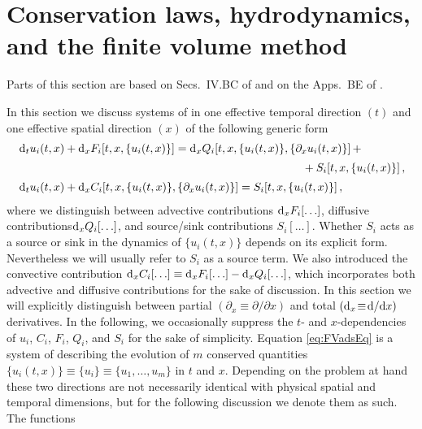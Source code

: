 \section{Conservation laws, hydrodynamics, and the finite volume method}\label{sec:conservationLaws}
\begin{disclaimer}
	Parts of this section are based on Secs.~IV.B\dash{}C of  and on the Apps.~B\dash{}E of . 
\end{disclaimer}
In this section we discuss systems of \pdes{} in one effective temporal direction $(t)$ and one effective spatial direction $(x)$ of the following generic form
\begin{align}
	&\dift\! u_i ( t, x ) + \difx\!  F_i [ t, x, \{u_i ( t, x )\} ] = \difx\! Q_i [ t, x, \{u_i ( t, x )\}, \{\partial_x u_i ( t, x )\} ]\,+\notag\\*[.2em] %
	&\hphantom{\dift\! u_i ( t, x ) + \difx\!  F_i [ t, x, \{u_i ( t, x )\} ] = \difx\! Q_i [ t, x, \{u_i ( t, x )\}xxx}+S_i [ t, x, \{u_i ( t, x )\} ] \, , \label{eq:FVadsEq}\\[.2em]
	&\dift\! u_i ( t, x ) + \difx\! C_i [ t, x, \{u_i ( t, x )\}, \{\partial_x u_i ( t, x )\} ] = S_i [ t, x, \{u_i ( t, x )\} ] \, , \label{eq:FVcsEq}
\end{align}
where we distinguish between advective contributions $\difx\! F_i[\ldots]$, diffusive contributions$\difx\! Q_i[\ldots]$, and source/sink contributions $S_i [\ldots]$.
Whether $S_i$ acts as a source or sink in the dynamics of $\{u_i(t,x)\}$ depends on its explicit form.
Nevertheless we will usually refer to $S_i$ as a source term.
We also introduced the convective contribution $\difx\! C_i[\ldots]\equiv \difx\! F_i[\ldots] - \difx\! Q_i[\ldots]$, which incorporates both advective and diffusive contributions for the sake of discussion. 
In this section we will explicitly distinguish between partial $(\partial_x\equiv\partial/\partial x)$ and total  $(\difx\!\equiv\!\dif/\!\dif x)$ derivatives.
In the following, we occasionally suppress the $t$- and $x$-dependencies of $u_i$, $C_i$, $F_i$, $Q_i$, and $S_i$ for the sake of simplicity.
Equation \eqref{eq:FVadsEq} is a system of \pdes{} describing the evolution of $m$ conserved quantities $\{u_i ( t, x )\}\equiv \{u_i\}\equiv\{ u_1 , \ldots , u_m \}$ in $t$ and $x$. 
Depending on the problem at hand these two directions are not necessarily identical with physical spatial and temporal dimensions, but for the following discussion we denote them as such.
The functions 
